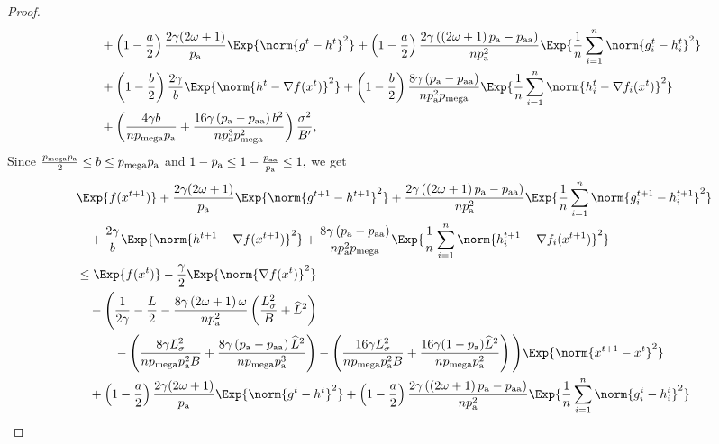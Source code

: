 \documentclass{article}
\newcommand*{\probavailable}{\ensuremath{p_{\textnormal{a}}}}
\newcommand*{\probpairaa}{\ensuremath{p_{\textnormal{aa}}}}
\newcommand*{\probmega}{\ensuremath{p_{\text{mega}}}}
\begin{document}
\begin{proof}
\begin{align*}
    &\quad + \left(1 - \frac{a}{2}\right)\frac{2\gamma(2\omega + 1)}{\probavailable} \Exp{\norm{g^{t} - h^{t}}^2} + \left(1 - \frac{a}{2}\right)\frac{2\gamma\left(\left(2 \omega + 1\right)\probavailable - \probpairaa\right)}{n \probavailable^2}\Exp{\frac{1}{n}\sum_{i=1}^n\norm{g^{t}_i - h^{t}_i}^2} \\
    &\quad + \left(1 - \frac{b}{2}\right)\frac{2\gamma}{b} \Exp{\norm{h^{t} - \nabla f(x^{t})}^2} + \left(1 - \frac{b}{2}\right)\frac{8 \gamma \left(\probavailable - \probpairaa\right)}{n \probavailable^2 \probmega}\Exp{\frac{1}{n}\sum_{i=1}^n\norm{h^{t}_i - \nabla f_i(x^{t})}^2} \\
    &\quad + \left(\frac{4 \gamma b}{n \probmega \probavailable} + \frac{16 \gamma \left(\probavailable - \probpairaa\right) b^2}{n \probavailable^3 \probmega^2}\right) \frac{\sigma^2}{B'},
  \end{align*}
  Since $\frac{\probmega \probavailable}{2} \leq b \leq \probmega \probavailable$ and $1 - \probavailable \leq 1 - \frac{\probpairaa}{\probavailable}\leq 1,$ we get 
  \begin{align*}
    &\Exp{f(x^{t + 1})} + \frac{2\gamma(2\omega + 1)}{\probavailable} \Exp{\norm{g^{t+1} - h^{t+1}}^2} + \frac{2\gamma\left(\left(2 \omega + 1\right)\probavailable - \probpairaa\right)}{n \probavailable^2} \Exp{\frac{1}{n}\sum_{i=1}^n\norm{g^{t+1}_i - h^{t+1}_i}^2}\\
    &\quad  + \frac{2\gamma}{b} \Exp{\norm{h^{t+1} - \nabla f(x^{t+1})}^2} + \frac{8 \gamma \left(\probavailable - \probpairaa\right)}{n \probavailable^2 \probmega} \Exp{\frac{1}{n}\sum_{i=1}^n\norm{h^{t+1}_i - \nabla f_i(x^{t+1})}^2}\\
    &\leq \Exp{f(x^t)} - \frac{\gamma}{2}\Exp{\norm{\nabla f(x^t)}^2} \\
    &\quad - \Bigg(\frac{1}{2\gamma} - \frac{L}{2} - \frac{8 \gamma \left(2 \omega + 1\right)\omega}{n \probavailable^2}\left(\frac{L_{\sigma}^2}{B} + \widehat{L}^2\right) \\
    &\qquad\quad - \left(\frac{8 \gamma L_{\sigma}^2}{n \probmega \probavailable^2 B} + \frac{8 \gamma\left(\probavailable - \probpairaa\right) \widehat{L}^2}{n \probmega \probavailable^3 }\right) - \left(\frac{16 \gamma L_{\sigma}^2}{n \probmega \probavailable^2 B} + \frac{16 \gamma (1 - \probavailable) \widehat{L}^2}{n \probmega \probavailable^2}\right)\Bigg) \Exp{\norm{x^{t+1} - x^t}^2} \\
    &\quad + \left(1 - \frac{a}{2}\right)\frac{2\gamma(2\omega + 1)}{\probavailable} \Exp{\norm{g^{t} - h^{t}}^2} + \left(1 - \frac{a}{2}\right)\frac{2\gamma\left(\left(2 \omega + 1\right)\probavailable - \probpairaa\right)}{n \probavailable^2}\Exp{\frac{1}{n}\sum_{i=1}^n\norm{g^{t}_i - h^{t}_i}^2} \\

\end{align*}
\end{proof}
\end{document}
